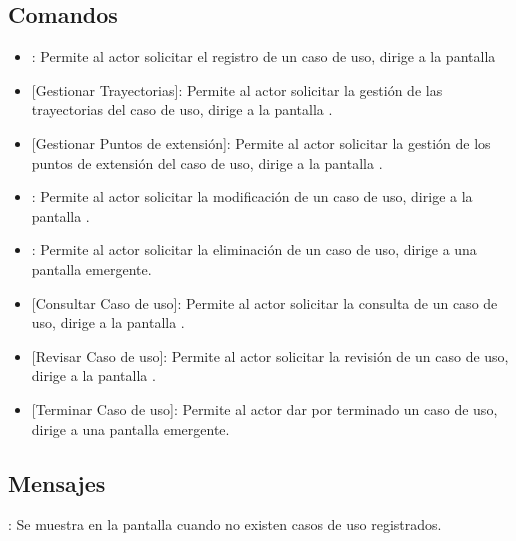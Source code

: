 \subsection{Comandos}
\begin{itemize}
	\item {}: Permite al actor solicitar el registro de un caso de uso, dirige a la pantalla 
	\item {} [Gestionar Trayectorias]: Permite al actor solicitar la gestión de las trayectorias del caso de
	uso, dirige a la pantalla .
	\item {} [Gestionar Puntos de extensión]: Permite al actor solicitar la gestión de los puntos de extensión del caso de uso, dirige a la pantalla .
	\item {}: Permite al actor solicitar la modificación de un caso de uso, dirige a la pantalla .
	\item {}: Permite al actor solicitar la eliminación de un caso de uso, dirige a una pantalla emergente.
	\item {} [Consultar Caso de uso]: Permite al actor solicitar la consulta de un caso de uso, dirige a la pantalla .\\
	\item {} [Revisar Caso de uso]: Permite al actor solicitar la revisión de un caso de uso, dirige a la pantalla .
	\item {} [Terminar Caso de uso]: Permite al actor dar por terminado un caso de uso, dirige a una pantalla emergente.
\end{itemize}

\subsection{Mensajes}

\begin{Citemize}
	\item {}: Se muestra en la pantalla  cuando no existen casos de uso registrados.
\end{Citemize}
